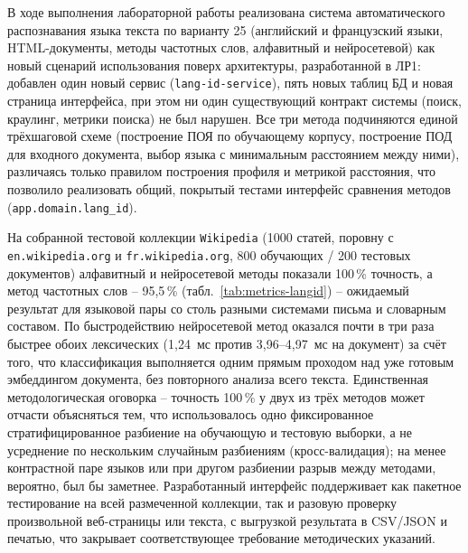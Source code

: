 

В ходе выполнения лабораторной работы реализована система
автоматического распознавания языка текста по варианту 25 (английский и
французский языки, HTML-документы, методы частотных слов, алфавитный и
нейросетевой) как новый сценарий использования поверх архитектуры,
разработанной в ЛР1: добавлен один новый сервис (\texttt{lang-id-service}),
пять новых таблиц БД и новая страница интерфейса, при этом ни один
существующий контракт системы (поиск, краулинг, метрики поиска) не
был нарушен. Все три метода подчиняются единой трёхшаговой схеме
(построение ПОЯ по обучающему корпусу, построение ПОД для входного
документа, выбор языка с минимальным расстоянием между ними), различаясь
только правилом построения профиля и метрикой расстояния, что позволило
реализовать общий, покрытый тестами интерфейс сравнения методов
(\texttt{app.domain.lang\_id}).

На собранной тестовой коллекции \texttt{Wikipedia} (1000 статей,
поровну с \texttt{en.wikipedia.org} и \texttt{fr.wikipedia.org},
800 обучающих / 200 тестовых документов) алфавитный и нейросетевой
методы показали 100\,\% точность, а метод частотных слов -- 95{,}5\,\%
(табл.~\ref{tab:metrics-langid}) -- ожидаемый результат для языковой
пары со столь разными системами письма и словарным составом. По
быстродействию нейросетевой метод оказался почти в три раза быстрее
обоих лексических (1{,}24~мс против 3{,}96--4{,}97~мс на документ) за
счёт того, что классификация выполняется одним прямым проходом над уже
готовым эмбеддингом документа, без повторного анализа всего текста.
Единственная методологическая оговорка -- точность 100\,\% у двух из
трёх методов может отчасти объясняться тем, что использовалось одно
фиксированное стратифицированное разбиение на обучающую и тестовую
выборки, а не усреднение по нескольким случайным разбиениям
(кросс-валидация); на менее контрастной паре языков или при другом
разбиении разрыв между методами, вероятно, был бы заметнее. Разработанный
интерфейс поддерживает как пакетное тестирование на всей размеченной
коллекции, так и разовую проверку произвольной веб-страницы или текста,
с выгрузкой результата в CSV/JSON и печатью, что закрывает
соответствующее требование методических указаний.

